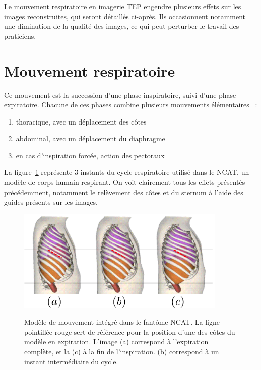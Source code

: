 Le mouvement respiratoire en imagerie TEP engendre plusieurs effets sur les images reconstruites, qui seront détaillés ci-après. Ils occasionnent notamment une diminution de la qualité des images, ce qui peut perturber le travail des praticiens.

\section{Mouvement respiratoire}

Ce mouvement est la succession d'une phase inspiratoire, suivi d'une phase expiratoire. Chacune de ces phases combine plusieurs mouvements élémentaires~\cite{servant2007cours} :
 
\begin{enumerate}
 \item thoracique, avec un déplacement des côtes
 \item abdominal, avec un déplacement du diaphragme
 \item en cas d'inspiration forcée, action des pectoraux
\end{enumerate}

La figure~\ref{fig:respiXCAT} représente 3 instants du cycle respiratoire utilisé dans le NCAT, un modèle de corps humain respirant. On voit clairement tous les effets présentés précédemment, notamment le relèvement des côtes et du sternum à l’aide des guides présents sur les images.

\begin{figure}[h!]
    \begin{center}
            \includegraphics[width=10cm]{images/mvtRespi} \\
    \end{center}
    \caption{Modèle de mouvement intégré dans le fantôme NCAT. La ligne pointillée rouge sert de référence pour la position d'une des côtes du modèle en expiration. L'image (a) correspond à l'expiration complète, et la (c) à la fin de l'inspiration. (b) correspond à un instant intermédiaire du cycle. }
    \label{fig:respiXCAT}
\end{figure}


